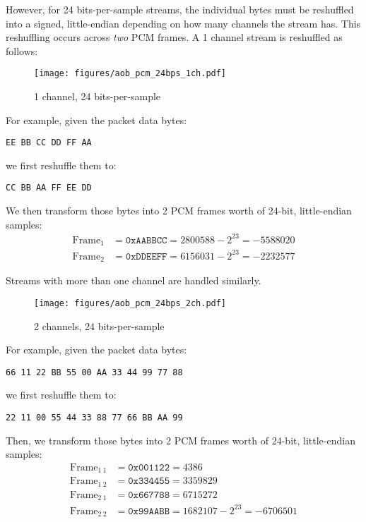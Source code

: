 However, for 24 bits-per-sample streams, the individual bytes must
be reshuffled into a signed, little-endian depending on
how many channels the stream has.
This reshuffling occurs across \textit{two} PCM frames.
A 1 channel stream is reshuffled as follows:
\begin{figure}[h]
\texttt{[image: figures/aob\_pcm\_24bps\_1ch.pdf]}
\caption{1 channel, 24 bits-per-sample}
\end{figure}
\par
\noindent
For example, given the packet data bytes:
\begin{Verbatim}
EE BB CC DD FF AA
\end{Verbatim}
\par
\noindent
we first reshuffle them to:
\begin{Verbatim}
CC BB AA FF EE DD
\end{Verbatim}
We then transform those bytes into 2 PCM frames worth of 24-bit,
little-endian samples:
\begin{align*}
\text{Frame}_1 &= \texttt{0xAABBCC} = 2800588 - 2 ^ {23} = -5588020 \\
\text{Frame}_2 &= \texttt{0xDDEEFF} = 6156031 - 2 ^ {23} = -2232577
\end{align*}

Streams with more than one channel are handled similarly.

\clearpage

\begin{figure}[h!]
\texttt{[image: figures/aob\_pcm\_24bps\_2ch.pdf]}
\caption{2 channels, 24 bits-per-sample}
\end{figure}
\par
\noindent
For example, given the packet data bytes:
\begin{Verbatim}
66 11 22 BB 55 00 AA 33 44 99 77 88
\end{Verbatim}
\par
\noindent
we first reshuffle them to:
\begin{Verbatim}
22 11 00 55 44 33 88 77 66 BB AA 99
\end{Verbatim}
\par
\noindent
Then, we transform those bytes into 2 PCM frames worth of 24-bit,
little-endian samples:
\begin{align*}
\text{Frame}_{1~1} &= \texttt{0x001122} = 4386 \\
\text{Frame}_{1~2} &= \texttt{0x334455} = 3359829 \\
\text{Frame}_{2~1} &= \texttt{0x667788} = 6715272 \\
\text{Frame}_{2~2} &= \texttt{0x99AABB} = 1682107 - 2 ^ {23} = -6706501
\end{align*}

